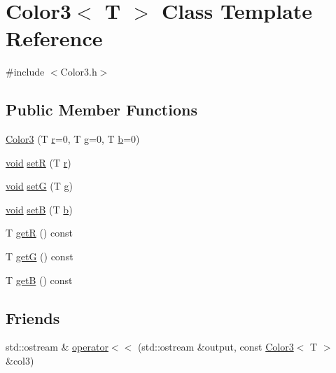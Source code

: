 \hypertarget{class_color3}{\section{Color3$<$ T $>$ Class Template Reference}
\label{class_color3}
}


{\ttfamily \#include $<$Color3.\-h$>$}

\subsection*{Public Member Functions}
\begin{DoxyCompactItemize}
\item 
\hyperlink{class_color3_a57917faf714145bb9a14a735d39440f6}{Color3} (T \hyperlink{gl3_8h_abe08814c2f72843fde4d8df41440d5a0}{r}=0, T \hyperlink{gl3_8h_a9cd653b1648845554169fbc3a3f6d37a}{g}=0, T \hyperlink{gl3_8h_a6eba317e3cf44d6d26c04a5a8f197dcb}{b}=0)
\item 
\hyperlink{glutf90_8h_ac778d6f63f1aaf8ebda0ce6ac821b56e}{void} \hyperlink{class_color3_a84e9bef2029f7fbdef82dbdcdaf0999a}{set\-R} (T \hyperlink{gl3_8h_abe08814c2f72843fde4d8df41440d5a0}{r})
\item 
\hyperlink{glutf90_8h_ac778d6f63f1aaf8ebda0ce6ac821b56e}{void} \hyperlink{class_color3_a2448d21c208b5bfc716f0bac62b5dc4a}{set\-G} (T \hyperlink{gl3_8h_a9cd653b1648845554169fbc3a3f6d37a}{g})
\item 
\hyperlink{glutf90_8h_ac778d6f63f1aaf8ebda0ce6ac821b56e}{void} \hyperlink{class_color3_a57a6c269ee5856587b041270cf1d33a4}{set\-B} (T \hyperlink{gl3_8h_a6eba317e3cf44d6d26c04a5a8f197dcb}{b})
\item 
T \hyperlink{class_color3_a366fbc86fc67ff524454c167b611bb5d}{get\-R} () const 
\item 
T \hyperlink{class_color3_aa452b73c89ba85c3f8377dd62cac9660}{get\-G} () const 
\item 
T \hyperlink{class_color3_a1428c3e15b143f04b3c3a4a352a70e58}{get\-B} () const 
\end{DoxyCompactItemize}
\subsection*{Friends}
\begin{DoxyCompactItemize}
\item 
std\-::ostream \& \hyperlink{class_color3_ac9f30838223a6527f03dbabf268d0888}{operator$<$$<$} (std\-::ostream \&output, const \hyperlink{class_color3}{Color3}$<$ T $>$ \&col3)
\end{DoxyCompactItemize}



